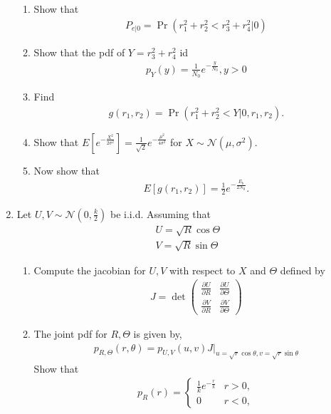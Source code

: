 \documentclass[journal,10pt,twocolumn]{IEEEtran}
\providecommand{\pr}[1]{\ensuremath{\Pr\left(#1\right)}}
\providecommand{\sbrak}[1]{\ensuremath{{}\left[#1\right]}}
\providecommand{\brak}[1]{\ensuremath{\left(#1\right)}}
\begin{document}
\begin{enumerate}
\begin{enumerate}[label=(\alph{enumii})]
%
\item 
Show that 
%
\begin{align}
P_{e|0}=\pr{r_1^2+r_2^2 < r_3^2+r_4^2 | 0}
\end{align}
%
\item 
Show that the pdf of $Y=r_3^2+r_4^2$ id
%
\begin{align}
p_{Y}(y) = \frac{1}{N_0}e^{-\frac{y}{N_0}}, y > 0
\end{align}
%
\item 
Find 
%
\begin{align}
g\brak{r_1,r_2} = \pr{r_1^2+r_2^2<Y|0,r_1,r_2}.
\end{align}
\item 
Show that $E\sbrak{e^{-\frac{X^2}{2\sigma^2}}}=\frac{1}{\sqrt{2}}e^{-\frac{\mu^2}{4\sigma^2}}$ for $X \sim 
\mathcal{N}\brak{\mu,\sigma^2}$.
%
\item 
Now show that
%
\begin{align}
E\sbrak{g\brak{r_1,r_2}}=\frac{1}{2}e^{-\frac{E_b}{2N_0}}.
\end{align}
%
\end{enumerate}
\item
 Let $U,V\sim\mathcal{N}\brak{0,\frac{k}{2}}$ be i.i.d.  Assuming that
%
\begin{align}
U = \sqrt{R} \cos \Theta \\
V = \sqrt{R} \sin \Theta
\end{align}
\begin{enumerate}[label=(\alph{enumii})]
\item 
Compute the jacobian for $U,V$ with respect to $X$ and $\Theta$ defined by
%
\begin{align}
J = \det\brak{
\begin{matrix}
\frac{\partial U}{\partial R} & \frac{\partial U}{\partial \Theta} \\
\frac{\partial V}{\partial R} & \frac{\partial V}{\partial \Theta}
\end{matrix}
}
\end{align}
\item 
The joint pdf for $R,\Theta$ is given by,
%
\begin{align}
p_{R,\Theta}\brak{r,\theta} = p_{U,V}\brak{u,v}J\vert_{u = \sqrt{r}\cos\theta,v = \sqrt{r}\sin\theta}
\end{align}
%
Show that
%
\begin{align}
p_{R}(r) = 
\begin{cases}
\frac{1}{k}e^{-\frac{r}{k}} & r > 0, \\
0 & r < 0,

\end{cases}
\end{align}
\end{enumerate}
\end{enumerate}
\end{document}

